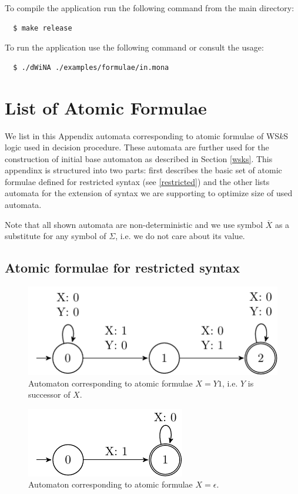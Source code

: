 To compile the application run the following command from the main directory:

\begin{verbatim}
  $ make release
\end{verbatim}

\noindent To run the application use the following command or consult the usage:
\begin{verbatim}
  $ ./dWiNA ./examples/formulae/in.mona
\end{verbatim}

\chapter{List of Atomic Formulae}

We list in this Appendix automata corresponding to atomic formulae of WS$k$S
logic used in decision procedure. These automata are further used for
the construction of initial base automaton as described in Section \ref{wsks}.
This appendinx is structured into two parts: first describes the basic set of
atomic formulae defined for restricted syntax (see \ref{restricted}) and the other
lists automata for the extension of syntax we are supporting to optimize size of
used automata.

Note that all shown automata are non-deterministic and we use symbol
$\overline{X}$ as a substitute for any symbol of $\Sigma$, i.e. we do not care
about its value.

\section{Atomic formulae for restricted syntax}

\begin{figure}[h!]
 \begin{center}
  \includegraphics{fig/atomic-equal-succ}
 \end{center}
 \caption{Automaton corresponding to atomic formulae $X = Y1$, i.e. $Y$ is
 successor of $X$.}
\end{figure}

\begin{figure}[h!]
 \begin{center}
  \includegraphics{fig/atomic-equals-zero}
 \end{center}
 \caption{Automaton corresponding to atomic formulae $X = \epsilon$.}
\end{figure}

